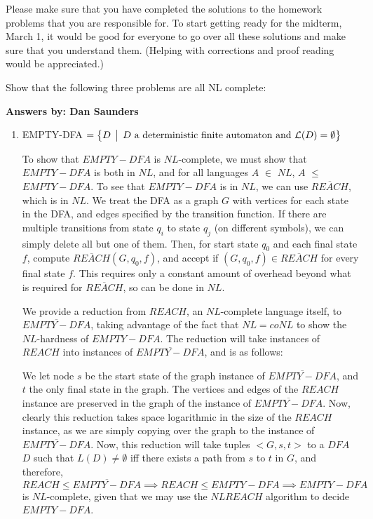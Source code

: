 \documentclass[12pt]{article}
\begin{document}
\thispagestyle{empty}
\noindent{}
\addtocounter{section}{7}

Please make sure that you have completed the solutions to the homework problems that you are
responsible for.   To start getting ready for the midterm, March 1, it would be good for everyone to
go over all these solutions and make sure that you understand them.  (Helping with corrections and
proof reading would be appreciated.)

Show that the following three problems are all NL complete:

\textbf{Answers by: Dan Saunders} 

\begin{enumerate}
\item  EMPTY-DFA $ = \bigl\{ D \,\bigm|\, D \mbox{ a deterministic finite automaton and } {\cal L}(D) =
  \emptyset \bigr\}$ 

To show that $EMPTY-DFA$ is $NL$-complete, we must show that $EMPTY-DFA$ is both in $NL$, and for all languages $A$ $\in$ $NL$, $A$ $\leq$ $EMPTY-DFA$. To see that $EMPTY-DFA$ is in $NL$, we can use $\overline{REACH}$, which is in $NL$. We treat the DFA as a graph $G$ with vertices for each state in the DFA, and edges specified by the transition function. If there are multiple transitions from state $q_i$ to state $q_j$ (on different symbols), we can simply delete all but one of them. Then, for start state $q_0$ and each final state $f$, compute $\overline{REACH}(G, q_0, f)$, and accept if $(G, q_0, f) \in \overline{REACH}$ for every final state $f$. This requires only a constant amount of overhead beyond what is required for $\overline{REACH}$, so can be done in $NL$.

We provide a reduction from $REACH$, an $NL$-complete language itself, to $\overline{EMPTY-DFA}$, taking advantage of the fact that $NL = coNL$ to show the $NL$-hardness of $EMPTY-DFA$. The reduction will take instances of $REACH$ into instances of $\overline{EMPTY-DFA}$, and is as follows: 

We let node $s$ be the start state of the graph instance of $\overline{EMPTY-DFA}$, and $t$ the only final state in the graph. The vertices and edges of the $REACH$ instance are preserved in the graph of the instance of $\overline{EMPTY-DFA}$. Now, clearly this reduction takes space logarithmic in the size of the $REACH$ instance, as we are simply copying over the graph to the instance of $\overline{EMPTY-DFA}$. Now, this reduction will take tuples $<G, s, t>$ to a $DFA$ $D$ such that $L(D) \neq \emptyset$ iff there exists a path from $s$ to $t$ in $G$, and therefore, $REACH \leq \overline{EMPTY-DFA} \implies REACH \leq EMPTY-DFA \implies EMPTY-DFA$ is $NL$-complete, given that we may use the $NL REACH$ algorithm to decide $EMPTY-DFA$.


\end{enumerate}
\end{document}
